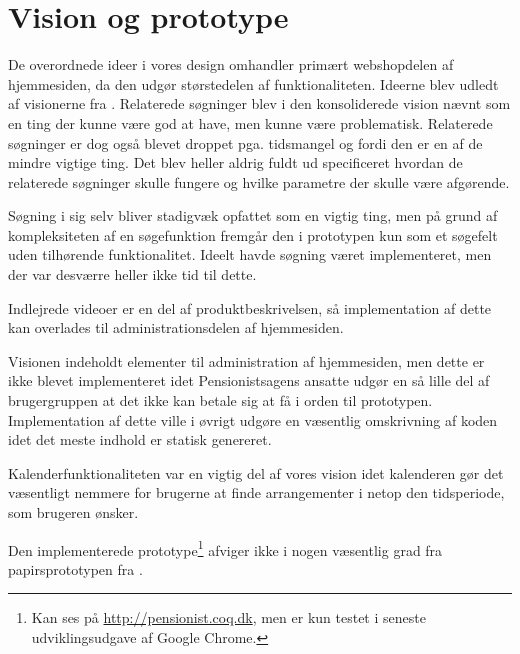 \section{Vision og prototype}

De overordnede ideer i vores design omhandler primært webshopdelen af
hjemmesiden, da den udgør størstedelen af funktionaliteten. Ideerne blev
udledt af visionerne fra \cite{opgave3}. Relaterede søgninger blev i den
konsoliderede vision nævnt som en ting der kunne være god at have, men
kunne være problematisk. Relaterede søgninger er dog også blevet droppet
pga. tidsmangel og fordi den er en af de mindre vigtige ting. Det blev heller
aldrig fuldt ud specificeret hvordan de relaterede søgninger skulle fungere
og hvilke parametre der skulle være afgørende.

Søgning i sig selv bliver stadigvæk opfattet som en vigtig ting, men på
grund af kompleksiteten af en søgefunktion fremgår den i prototypen kun som
et søgefelt uden tilhørende funktionalitet. Ideelt havde søgning været
implementeret, men der var desværre heller ikke tid til dette.

Indlejrede videoer er en del af produktbeskrivelsen, så implementation af
dette kan overlades til administrationsdelen af hjemmesiden.

Visionen indeholdt elementer til administration af hjemmesiden, men dette er
ikke blevet implementeret idet Pensionistsagens ansatte udgør en så lille
del af brugergruppen at det ikke kan betale sig at få i orden til prototypen.
Implementation af dette ville i øvrigt udgøre en væsentlig omskrivning af
koden idet det meste indhold er statisk genereret.

Kalenderfunktionaliteten var en vigtig del af vores vision idet kalenderen
gør det væsentligt nemmere for brugerne at finde arrangementer i netop den
tidsperiode, som brugeren ønsker.

Den implementerede prototype\footnote{Kan ses på
\url{http://pensionist.coq.dk}, men er kun testet i seneste udviklingsudgave
af Google Chrome.} afviger ikke i nogen væsentlig grad fra papirsprototypen
fra \cite{opgave4}.
